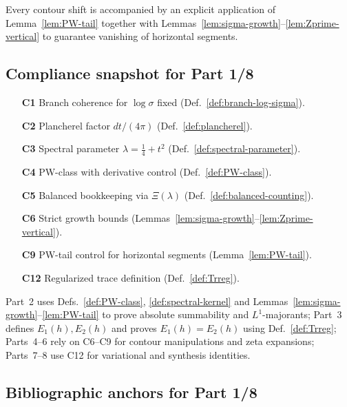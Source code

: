 \begin{invariant}
\label{inv:C9}
Every contour shift is accompanied by an explicit application of Lemma~\ref{lem:PW-tail} together with Lemmas~\ref{lem:sigma-growth}–\ref{lem:Zprime-vertical} to guarantee vanishing of horizontal segments. \relax
\end{invariant}

\subsection{Compliance snapshot for Part 1/8} %
\label{subsec:ch4-part1-compliance} \relax

\begin{itemize}
  \item[\textbf{C1}] Branch coherence for $\log\sigma$ fixed (Def.~\ref{def:branch-log-sigma}). %
  \item[\textbf{C2}] Plancherel factor $dt/(4\pi)$ (Def.~\ref{def:plancherel}). %
  \item[\textbf{C3}] Spectral parameter $\lambda=\tfrac14+t^2$ (Def.~\ref{def:spectral-parameter}). %
  \item[\textbf{C4}] PW-class with derivative control (Def.~\ref{def:PW-class}). %
  \item[\textbf{C5}] Balanced bookkeeping via $\Xi(\lambda)$ (Def.~\ref{def:balanced-counting}). %
  \item[\textbf{C6}] Strict growth bounds (Lemmas~\ref{lem:sigma-growth}–\ref{lem:Zprime-vertical}). %
  \item[\textbf{C9}] PW-tail control for horizontal segments (Lemma~\ref{lem:PW-tail}). %
  \item[\textbf{C12}] Regularized trace definition (Def.~\ref{def:Trreg}). %
\end{itemize}

\begin{remark}
\label{rem:forward-deps}
Part~2 uses Defs.~\ref{def:PW-class}, \ref{def:spectral-kernel} and Lemmas~\ref{lem:sigma-growth}–\ref{lem:PW-tail} to prove absolute summability and $L^1$-majorants; Part~3 defines $E_1(h),E_2(h)$ and proves $E_1(h)=E_2(h)$ using Def.~\ref{def:Trreg}; Parts~4–6 rely on C6–C9 for contour manipulations and zeta expansions; Parts~7–8 use C12 for variational and synthesis identities. \relax
\end{remark}

\subsection{Bibliographic anchors for Part 1/8} %
\label{subsec:ch4-part1-bib-anchors} \relax

